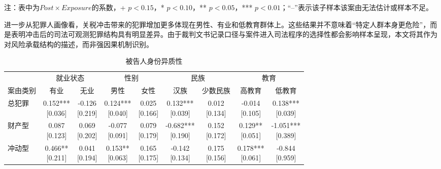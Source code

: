 \documentclass[a4paper,12pt]{report}
\begin{document}
\begin{table}[H]
\par\raggedright{} 注：表中为$Post\times Exposure$的系数，+ $p<0.15$，* $p<0.10$，** $p<0.05$，*** $p<0.01$；“--”表示该子样本该案由无法估计或样本不足。
\end{table}



进一步从犯罪人画像看，关税冲击带来的犯罪增加更多体现在男性、有业和低教育群体上。这些结果并不意味着“特定人群本身更危险”，而是表明冲击后的司法可观测犯罪结构具有明显差异。由于裁判文书记录口径与案件进入司法程序的选择性都会影响样本呈现，本文将其作为对风险承载结构的描述，而非强因果机制识别。

\begin{table}[H]
\centering
\caption{被告人身份异质性}
\label{tab:hetero_defendant}
\begin{adjustbox}{width=\textwidth}
\begin{tabular}{lcccccccc}
\toprule
 & \multicolumn{2}{c}{就业状态} & \multicolumn{2}{c}{性别} & \multicolumn{2}{c}{民族} & \multicolumn{2}{c}{教育} \\
\cmidrule(lr){2-3}\cmidrule(lr){4-5}\cmidrule(lr){6-7}\cmidrule(lr){8-9}
案由类别 & 有业 & 无业 & 男性 & 女性 & 汉族 & 少数民族 & 高教育 & 低教育 \\
\midrule
总犯罪 & \makecell{0.152***\\{[0.036]}} & \makecell{-0.126\\{[0.219]}} & \makecell{0.124***\\{[0.040]}} & \makecell{0.025\\{[0.166]}} & \makecell{0.132***\\{[0.039]}} & \makecell{0.012\\{[0.134]}} & \makecell{-0.014\\{[0.105]}} & \makecell{0.138***\\{[0.039]}} \\
财产型 & \makecell{0.087\\{[0.123]}} & \makecell{0.069\\{[0.202]}} & \makecell{-0.077\\{[0.091]}} & \makecell{0.079\\{[0.179]}} & \makecell{-0.682***\\{[0.190]}} & \makecell{0.152\\{[0.172]}} & \makecell{0.129**\\{[0.051]}} & \makecell{-1.051***\\{[0.389]}} \\
冲动型 & \makecell{0.466**\\{[0.211]}} & \makecell{0.041\\{[0.194]}} & \makecell{0.153**\\{[0.063]}} & \makecell{0.165\\{[0.175]}} & \makecell{-0.142\\{[0.134]}} & \makecell{0.175\\{[0.156]}} & \makecell{0.178***\\{[0.061]}} & \makecell{-0.844\\{[0.959]}} \\

\end{tabular}
\end{adjustbox}
\end{table}
\end{document}
